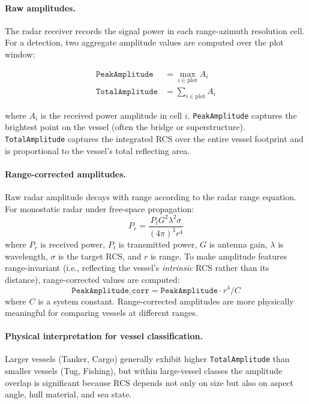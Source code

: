 \documentclass[12pt, a4paper]{article}
\begin{document}
\paragraph{Raw amplitudes.}
The radar receiver records the signal power in each range-azimuth resolution cell.
For a detection, two aggregate amplitude values are computed over the plot window:

\begin{align}
    \texttt{PeakAmplitude} &= \max_{i \in \text{plot}} A_i \label{eq:peak}\\
    \texttt{TotalAmplitude} &= \sum_{i \in \text{plot}} A_i \label{eq:total}
\end{align}

where $A_i$ is the received power amplitude in cell $i$.
\texttt{PeakAmplitude} captures the brightest point on the vessel (often the
bridge or superstructure). \texttt{TotalAmplitude} captures the integrated RCS
over the entire vessel footprint and is proportional to the vessel's total
reflecting area.

\paragraph{Range-corrected amplitudes.}
Raw radar amplitude decays with range according to the radar range equation.
For monostatic radar under free-space propagation:
\begin{equation}
    P_r = \frac{P_t G^2 \lambda^2 \sigma}{(4\pi)^3 r^4}
    \label{eq:radar_eq}
\end{equation}
where $P_r$ is received power, $P_t$ is transmitted power, $G$ is antenna gain,
$\lambda$ is wavelength, $\sigma$ is the target RCS, and $r$ is range.
To make amplitude features range-invariant (i.e., reflecting the vessel's
\emph{intrinsic} RCS rather than its distance), range-corrected values are
computed:
\begin{equation}
    \texttt{PeakAmplitude\_corr} = \texttt{PeakAmplitude} \cdot r^4 / C
    \label{eq:amp_corr}
\end{equation}
where $C$ is a system constant. Range-corrected amplitudes are more physically
meaningful for comparing vessels at different ranges.

\paragraph{Physical interpretation for vessel classification.}
Larger vessels (Tanker, Cargo) generally exhibit higher \texttt{TotalAmplitude}
than smaller vessels (Tug, Fishing), but within large-vessel classes the
amplitude overlap is significant because RCS depends not only on size but also
on aspect angle, hull material, and sea state.
\end{document}
